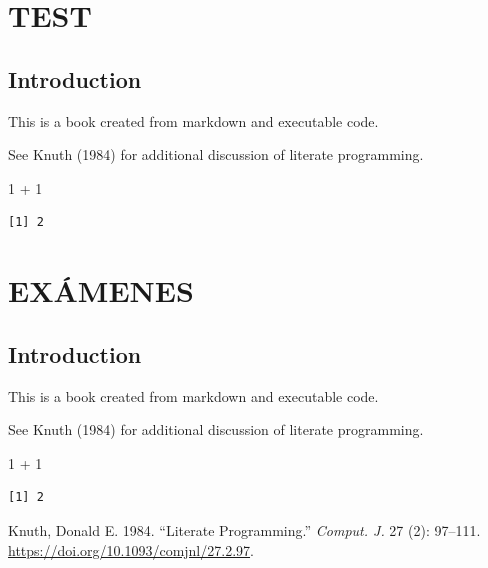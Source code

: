 \documentclass[
  letterpaper,
  DIV=11,
  numbers=noendperiod]{scrreprt}
\newenvironment{Shaded}{\begin{snugshade}}{\end{snugshade}}
\newcommand{\DecValTok}[1]{\textcolor[rgb]{0.68,0.00,0.00}{#1}}
\newcommand{\SpecialCharTok}[1]{\textcolor[rgb]{0.37,0.37,0.37}{#1}}
\newlength{\cslhangindent}
\newenvironment{CSLReferences}[2] %
 {\begin{list}{}{%
  \setlength{\itemindent}{0pt}
  \setlength{\leftmargin}{0pt}
  \setlength{\parsep}{0pt}
  \ifodd #1
   \setlength{\leftmargin}{\cslhangindent}
   \setlength{\itemindent}{-1\cslhangindent}
  \fi
  \setlength{\itemsep}{#2\baselineskip}}}
 {\end{list}}
\begin{document}
\part{TEST}

\chapter{Introduction}\label{introduction}

This is a book created from markdown and executable code.

See Knuth (1984) for additional discussion of literate programming.

\begin{Shaded}
\begin{Highlighting}[]
\DecValTok{1} \SpecialCharTok{+} \DecValTok{1}
\end{Highlighting}
\end{Shaded}

\begin{verbatim}
[1] 2
\end{verbatim}

\part{EXÁMENES}

\chapter{Introduction}\label{introduction-1}

This is a book created from markdown and executable code.

See Knuth (1984) for additional discussion of literate programming.

\begin{Shaded}
\begin{Highlighting}[]
\DecValTok{1} \SpecialCharTok{+} \DecValTok{1}
\end{Highlighting}
\end{Shaded}

\begin{verbatim}
[1] 2
\end{verbatim}

\label{refs}
\begin{CSLReferences}{1}{0}
Knuth, Donald E. 1984. {``Literate Programming.''} \emph{Comput. J.} 27
(2): 97--111. \url{https://doi.org/10.1093/comjnl/27.2.97}.

\end{CSLReferences}
\end{document}
